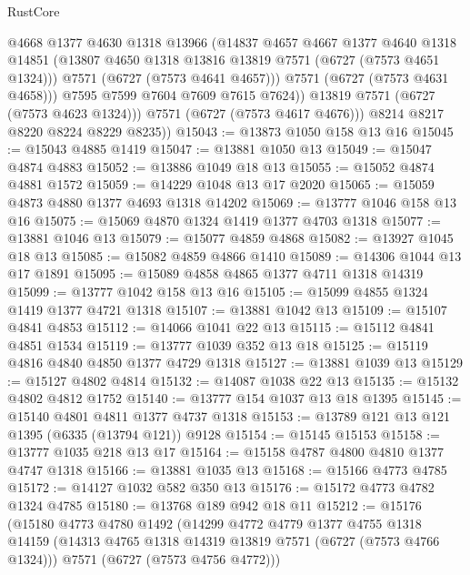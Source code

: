 \begin{lexlean}{RustCore}
\begin{coremodule}
                  @4668
                  @1377
                  @4630
                  @1318
                  @13966
                  (@14837
                    @4657
                    @4667
                    @1377
                    @4640
                    @1318
                    @14851
                    (@13807 @4650 @1318 @13816 @13819 @7571 (@6727 (@7573 @4651 @1324)))
                    @7571
                    (@6727 (@7573 @4641 @4657)))
                  @7571
                  (@6727 (@7573 @4631 @4658)))
                @7595
                @7599
                @7604
                @7609
                @7615
                @7624))
            @13819
            @7571
            (@6727 (@7573 @4623 @1324)))
          @7571
          (@6727 (@7573 @4617 @4676)))
        @8214
        @8217
        @8220
        @8224
        @8229
        @8235))
@15043 := @13873 @1050 @158 @13 @16
@15045 := @15043 @4885 @1419
@15047 := @13881 @1050 @13
@15049 := @15047 @4874 @4883
@15052 := @13886 @1049 @18 @13
@15055 := @15052 @4874 @4881 @1572
@15059 := @14229 @1048 @13 @17 @2020
@15065 := @15059 @4873 @4880 @1377 @4693 @1318 @14202
@15069 := @13777 @1046 @158 @13 @16
@15075 := @15069 @4870 @1324 @1419 @1377 @4703 @1318
@15077 := @13881 @1046 @13
@15079 := @15077 @4859 @4868
@15082 := @13927 @1045 @18 @13
@15085 := @15082 @4859 @4866 @1410
@15089 := @14306 @1044 @13 @17 @1891
@15095 := @15089 @4858 @4865 @1377 @4711 @1318 @14319
@15099 := @13777 @1042 @158 @13 @16
@15105 := @15099 @4855 @1324 @1419 @1377 @4721 @1318
@15107 := @13881 @1042 @13
@15109 := @15107 @4841 @4853
@15112 := @14066 @1041 @22 @13
@15115 := @15112 @4841 @4851 @1534
@15119 := @13777 @1039 @352 @13 @18
@15125 := @15119 @4816 @4840 @4850 @1377 @4729 @1318
@15127 := @13881 @1039 @13
@15129 := @15127 @4802 @4814
@15132 := @14087 @1038 @22 @13
@15135 := @15132 @4802 @4812 @1752
@15140 := @13777 @154 @1037 @13 @18 @1395
@15145 := @15140 @4801 @4811 @1377 @4737 @1318
@15153 := @13789 @121 @13 @121 @1395 (@6335 (@13794 @121)) @9128
@15154 := @15145 @15153
@15158 := @13777 @1035 @218 @13 @17
@15164 := @15158 @4787 @4800 @4810 @1377 @4747 @1318
@15166 := @13881 @1035 @13
@15168 := @15166 @4773 @4785
@15172 := @14127 @1032 @582 @350 @13
@15176 := @15172 @4773 @4782 @1324 @4785
@15180 := @13768 @189 @942 @18 @11
@15212 := @15176
    (@15180
      @4773
      @4780
      @1492
      (@14299
        @4772
        @4779
        @1377
        @4755
        @1318
        @14159
        (@14313 @4765 @1318 @14319 @13819 @7571 (@6727 (@7573 @4766 @1324)))
        @7571
        (@6727 (@7573 @4756 @4772)))

\end{coremodule}
\end{lexlean}
